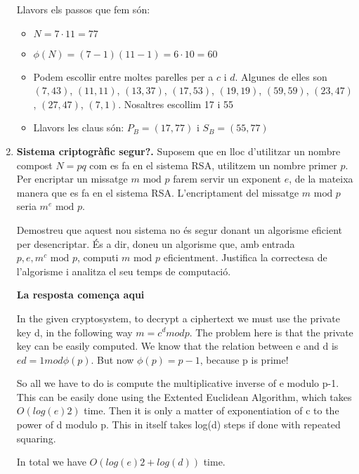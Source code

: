 \documentclass[a4paper,10pt]{article}
\begin{document}
\begin{enumerate}
 Llavors els passos que fem són:
 \begin{itemize}
 \item $N = 7 \cdot 11 = 77$
 \item $\phi(N) = (7 - 1)(11 - 1) = 6 \cdot 10 = 60$
  \item Podem escollir entre moltes parelles per a $c$ i $d$. Algunes de elles son $(7,43)$, 
  $(11,11)$, 
  $(13,37)$, 
  $(17,53)$, 
  $(19,19)$, 
  $(59,59)$, 
  $(23,47)$, 
  $(27,47)$, 
  $(7,1)$. Nosaltres escollim 17 i 55
  \item Llavors les claus són: $P_B = (17, 77)$ i $S_B = (55, 77)$
 \end{itemize}


 
 
 \item \textbf{Sistema criptogràfic segur?. }Suposem que en lloc d'utilitzar un nombre compost $N = pq$ com es fa en el sistema RSA, utilitzem un nombre primer $p$. Per encriptar un missatge $m \textrm{ mod } p$ farem servir un exponent $e$, de la mateixa manera que es fa en el sistema RSA. L'encriptament del missatge $m \textrm{ mod } p$ seria $m^e \textrm{ mod } p$.
 
 Demostreu que aquest nou sistema no és segur donant un algorisme eficient per desencriptar. És a dir, doneu un algorisme que, amb entrada $p,e,m^c \textrm{ mod } p$, computi $m \textrm{ mod } p$ eficientment. Justifica la correctesa de l'algorisme i analitza el seu temps de computació.
 
 \textbf{La resposta comença aqui}
 
 In the given cryptosystem, to decrypt a ciphertext we must use the private key d, in the following way $m = c^d mod p$. The problem here is that the private key can be easily computed. We know that the relation between e and d is $ed = 1 mod \phi(p)$.
But now $\phi(p)=p-1$, because p is prime! 

So all we have to do is compute the multiplicative inverse of e modulo p-1. This can be easily done using the Extented Euclidean Algorithm, which takes $O(log(e)2)$ time. Then it is only a matter of exponentiation of c to the power of d modulo p. This in itself takes log(d) steps if done with repeated squaring. 

In total we have $O(log(e)2+log(d))$ time.
\end{enumerate}
\end{document}
